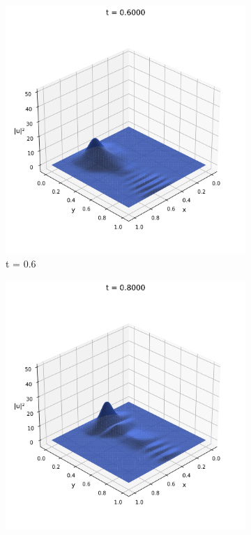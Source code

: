 \documentclass{article}
\theoremstyle{definition}
\theoremstyle{plain}
\theoremstyle{remark}
\begin{document}
\begin{figure}[h]
  \begin{subfigure}[b]{0.3\textwidth}
    \centering
    \includegraphics[width=\textwidth, trim=0cm 0cm 0cm 1cm, clip]{figures/fem_potential_frame_0060.png}
    \caption{t = 0.6}
  \end{subfigure}
  \hfill
  \begin{subfigure}[b]{0.3\textwidth}
    \centering
    \includegraphics[width=\textwidth, trim=0cm 0cm 0cm 1cm, clip]{figures/fem_potential_frame_0080.png}

\end{subfigure}
\end{figure}
\end{document}
